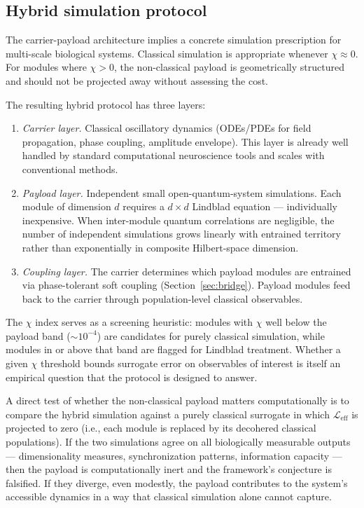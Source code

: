 \documentclass[11pt,a4paper]{article}
\theoremstyle{definition}
\theoremstyle{remark}
\begin{document}
\subsection{Hybrid simulation protocol}
\label{sec:simulation}

The carrier-payload architecture implies a concrete simulation prescription for multi-scale biological systems. Classical simulation is appropriate whenever $\chi\approx 0$. For modules where $\chi > 0$, the non-classical payload is geometrically structured and should not be projected away without assessing the cost.

The resulting hybrid protocol has three layers:
\begin{enumerate}[label=(\roman*)]
\item \emph{Carrier layer.} Classical oscillatory dynamics (ODEs/PDEs for field propagation, phase coupling, amplitude envelope). This layer is already well handled by standard computational neuroscience tools and scales with conventional methods.
\item \emph{Payload layer.} Independent small open-quantum-system simulations. Each module of dimension $d$ requires a $d\times d$ Lindblad equation --- individually inexpensive. When inter-module quantum correlations are negligible, the number of independent simulations grows linearly with entrained territory rather than exponentially in composite Hilbert-space dimension.
\item \emph{Coupling layer.} The carrier determines which payload modules are entrained via phase-tolerant soft coupling (Section~\ref{sec:bridge}). Payload modules feed back to the carrier through population-level classical observables.
\end{enumerate}

The $\chi$ index serves as a screening heuristic: modules with $\chi$ well below the payload band ($\sim 10^{-4}$) are candidates for purely classical simulation, while modules in or above that band are flagged for Lindblad treatment. Whether a given $\chi$ threshold bounds surrogate error on observables of interest is itself an empirical question that the protocol is designed to answer.

A direct test of whether the non-classical payload matters computationally is to compare the hybrid simulation against a purely classical surrogate in which $\mathcal{L}_{\mathrm{eff}}$ is projected to zero (i.e., each module is replaced by its decohered classical populations). If the two simulations agree on all biologically measurable outputs --- dimensionality measures, synchronization patterns, information capacity --- then the payload is computationally inert and the framework's conjecture is falsified. If they diverge, even modestly, the payload contributes to the system's accessible dynamics in a way that classical simulation alone cannot capture.
\end{document}
